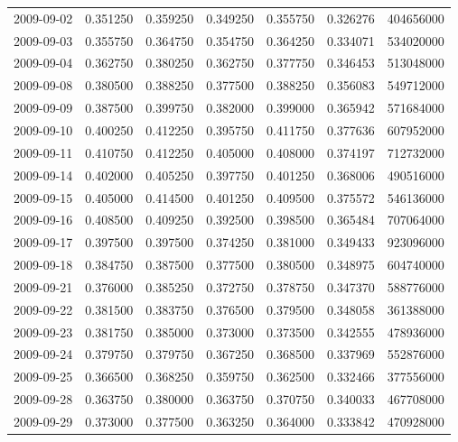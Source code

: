 \begin{tabular}{lrrrrrr}
2009-09-02 &    0.351250 &    0.359250 &    0.349250 &    0.355750 &    0.326276 &   404656000 \\
2009-09-03 &    0.355750 &    0.364750 &    0.354750 &    0.364250 &    0.334071 &   534020000 \\
2009-09-04 &    0.362750 &    0.380250 &    0.362750 &    0.377750 &    0.346453 &   513048000 \\
2009-09-08 &    0.380500 &    0.388250 &    0.377500 &    0.388250 &    0.356083 &   549712000 \\
2009-09-09 &    0.387500 &    0.399750 &    0.382000 &    0.399000 &    0.365942 &   571684000 \\
2009-09-10 &    0.400250 &    0.412250 &    0.395750 &    0.411750 &    0.377636 &   607952000 \\
2009-09-11 &    0.410750 &    0.412250 &    0.405000 &    0.408000 &    0.374197 &   712732000 \\
2009-09-14 &    0.402000 &    0.405250 &    0.397750 &    0.401250 &    0.368006 &   490516000 \\
2009-09-15 &    0.405000 &    0.414500 &    0.401250 &    0.409500 &    0.375572 &   546136000 \\
2009-09-16 &    0.408500 &    0.409250 &    0.392500 &    0.398500 &    0.365484 &   707064000 \\
2009-09-17 &    0.397500 &    0.397500 &    0.374250 &    0.381000 &    0.349433 &   923096000 \\
2009-09-18 &    0.384750 &    0.387500 &    0.377500 &    0.380500 &    0.348975 &   604740000 \\
2009-09-21 &    0.376000 &    0.385250 &    0.372750 &    0.378750 &    0.347370 &   588776000 \\
2009-09-22 &    0.381500 &    0.383750 &    0.376500 &    0.379500 &    0.348058 &   361388000 \\
2009-09-23 &    0.381750 &    0.385000 &    0.373000 &    0.373500 &    0.342555 &   478936000 \\
2009-09-24 &    0.379750 &    0.379750 &    0.367250 &    0.368500 &    0.337969 &   552876000 \\
2009-09-25 &    0.366500 &    0.368250 &    0.359750 &    0.362500 &    0.332466 &   377556000 \\
2009-09-28 &    0.363750 &    0.380000 &    0.363750 &    0.370750 &    0.340033 &   467708000 \\
2009-09-29 &    0.373000 &    0.377500 &    0.363250 &    0.364000 &    0.333842 &   470928000 \\

\end{tabular}
